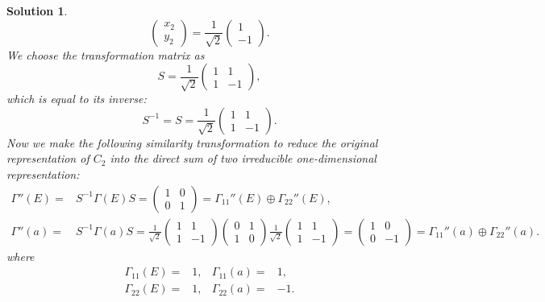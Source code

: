 \documentclass[UTF8,10pt,a4paper]{article}
\theoremstyle{Problem}
\theoremstyle{Solution}
\newtheorem*{sol}{Solution}
\begin{document}
\begin{sol}
\begin{equation}
        \left(\begin{matrix}
            x_2\\
            y_2
        \end{matrix}\right)=\frac{1}{\sqrt{2}}\left(\begin{matrix}
            1\\
            -1
        \end{matrix}\right).
    \end{equation}
    We choose the transformation matrix as
    \begin{equation}
        S=\frac{1}{\sqrt{2}}\left(\begin{matrix}
            1&1\\
            1&-1
        \end{matrix}\right),
    \end{equation}
    which is equal to its inverse:
    \begin{equation}
        S^{-1}=S=\frac{1}{\sqrt{2}}\left(\begin{matrix}
            1&1\\
            1&-1
        \end{matrix}\right).
    \end{equation}
    Now we make the following similarity transformation to reduce the original representation of $C_2$ into the direct sum of two irreducible one-dimensional representation:
    \begin{align}
        \Gamma''(E)=&S^{-1}\Gamma(E)S=\left(\begin{matrix}
            1&0\\
            0&1
        \end{matrix}\right)=\Gamma_{11}''(E)\oplus\Gamma_{22}''(E),\\
        \Gamma''(a)=&S^{-1}\Gamma(a)S=\frac{1}{\sqrt{2}}\left(\begin{matrix}
            1&1\\
            1&-1
        \end{matrix}\right)\left(\begin{matrix}
            0&1\\
            1&0
        \end{matrix}\right)\frac{1}{\sqrt{2}}\left(\begin{matrix}
            1&1\\
            1&-1
        \end{matrix}\right)=\left(\begin{matrix}
            1&0\\
            0&-1
        \end{matrix}\right)=\Gamma_{11}''(a)\oplus\Gamma_{22}''(a).
    \end{align}
    where
    \begin{align}
        \Gamma_{11}(E)=&1,&\Gamma_{11}(a)=&1,\\
        \Gamma_{22}(E)=&1,&\Gamma_{22}(a)=&-1.
    \end{align}
\end{sol}
\end{document}

